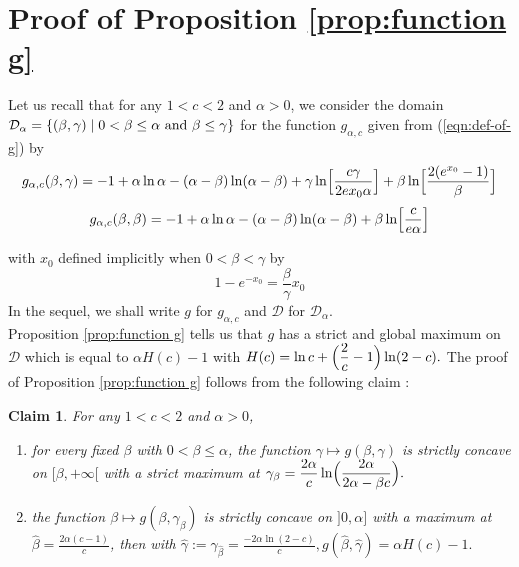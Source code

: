 \documentclass[aop,noinfoline]{imsart}
\newtheorem{claim}[theorem]{Claim}
\renewcommand{\hat}{\widehat}
\begin{document}
 



\section{Proof of Proposition \ref{prop:function g}}\label{sec:technical}


Let us recall that  for any $1<c<2$ and  $  \alpha > 0$,  we consider the  domain   
 $\displaystyle \mathcal{D}_{\alpha} = \{ (\beta,
 \gamma) \mid  0< \beta \le \alpha  \hbox { and } \beta \le \gamma\}$ for the function $g_{\alpha,c}$ given from (\ref{eqn:def-of-g}) by  
\begin{equation}\label{eqn-of-g} 
 g_{\alpha,c}(\beta, \gamma)=  -1 +\alpha\ln\alpha-(\alpha-\beta)\ln(\alpha-\beta)+ \gamma\ln \Bigl [\frac{c \gamma}{2ex_0\alpha}\Bigr ]+ \beta\ln \Bigl [\frac{2(e^{x_0}-1)}{\beta} \Bigr ]
   \end{equation}
   \begin{equation}\label{eqn-of-g-diag} 
 g_{\alpha,c}(\beta, \beta)=  -1 +\alpha\ln\alpha-(\alpha-\beta)\ln(\alpha-\beta)+ \beta\ln \Bigl [\frac{c}{e \alpha} \Bigr ]
   \end{equation}
 
 
 with $x_0$  defined implicitly  when $0<\beta<\gamma$ by 
 \begin{equation}\label{x0}
 1-e^{-x_0}=\frac{\beta}{\gamma} x_0
 \end{equation}
 In the sequel, we shall write $g$ for $g_{\alpha,c}$ and $\mathcal{D}$ for $ \mathcal{D}_{\alpha} $.\\
 
  Proposition \ref{prop:function g} tells us that $g$ has a  strict and global maximum on $\mathcal{D}$  which is equal to $ \alpha H(c)-1
$ with
$\displaystyle H(c)=\ln c+ \Bigl( \frac{2}{c}-1\Bigr ) \ln(2-c).$ The proof of   Proposition \ref{prop:function g}  follows from  the  following claim :


\begin{claim}
\label{onevariableproof} For any $1<c<2$ and  $\alpha>0$,
 
 \begin{enumerate}
\item  for every fixed $\beta$ with $0<\beta \le  \alpha$, the function 
$\gamma \mapsto g(\beta, \gamma)$ is strictly concave on $[\beta, +\infty[$ with a strict  maximum at $\displaystyle\gamma_{\beta}=\frac{2\alpha}{c}\ln \Bigl ( \frac{ 2\alpha}{2\alpha - \beta c}\Bigr ).$

\item the function $\beta \mapsto g(\beta, \gamma_{\beta})$  is strictly concave on $]0,\alpha]$ with a  maximum at  $\displaystyle \hat\beta =  \frac{2\alpha(c-1)}{c}$, then  with $\displaystyle 
 \hat\gamma :=\gamma_{\hat\beta}= \frac{-2\alpha\ln (2-c)}{c},    g  (\hat\beta,  \hat \gamma  ) =\alpha H(c)-1.$
     
\end{enumerate}
\end{claim}
\end{document}
